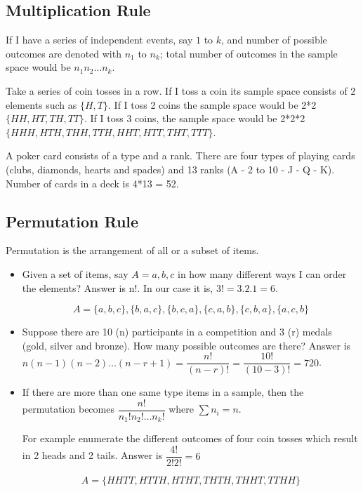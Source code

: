 \documentclass[]{book}
\theoremstyle{definition}
\theoremstyle{definition}
\theoremstyle{definition}
\theoremstyle{remark}
\begin{document}
\hypertarget{multiplication-rule}{%
\subsection{Multiplication Rule}\label{multiplication-rule}}

If I have a series of independent events, say \(1\) to \(k\), and number
of possible outcomes are denoted with \(n_1\) to \(n_k\); total number
of outcomes in the sample space would be \(n_1n_2\dots n_k\).

Take a series of coin tosses in a row. If I toss a coin its sample space
consists of 2 elements such as \(\{H,T\}\). If I toss 2 coins the sample
space would be 2*2 \(\{HH,HT,TH,TT\}\). If I toss 3 coins, the sample
space would be 2*2*2 \(\{HHH,HTH,THH,TTH,HHT,HTT,THT,TTT\}\).

A poker card consists of a type and a rank. There are four types of
playing cards (clubs, diamonds, hearts and spades) and 13 ranks (A - 2
to 10 - J - Q - K). Number of cards in a deck is 4*13 = 52.

\hypertarget{permutation-rule}{%
\subsection{Permutation Rule}\label{permutation-rule}}

Permutation is the arrangement of all or a subset of items.

\begin{itemize}
\item
  Given a set of items, say \(A = {a,b,c}\) in how many different ways I
  can order the elements? Answer is n!. In our case it is,
  \(3! = 3.2.1 = 6\).

  \[A = \{a,b,c\},\{b,a,c\},\{b,c,a\},\{c,a,b\},\{c,b,a\},\{a,c,b\}\]
\item
  Suppose there are 10 (n) participants in a competition and 3 (r)
  medals (gold, silver and bronze). How many possible outcomes are
  there? Answer is
  \(n(n-1)(n-2)\dots (n-r+1) = \dfrac{n!}{(n-r)!} = \dfrac{10!}{(10-3)!} = 720\).
\item
  If there are more than one same type items in a sample, then the
  permutation becomes \(\dfrac{n!}{n_1!n_2!\dots n_k!}\) where
  \(\sum n_i = n\).

  For example enumerate the different outcomes of four coin tosses which
  result in 2 heads and 2 tails. Answer is \(\dfrac{4!}{2!2!} = 6\)

  \[A = \{HHTT,HTTH,HTHT,THTH,THHT,TTHH\}\]
\end{itemize}
\end{document}
